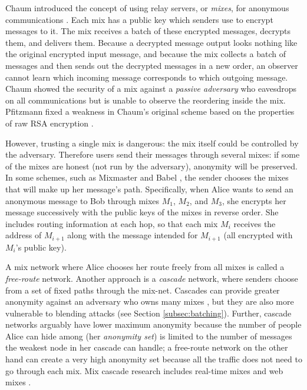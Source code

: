 \documentclass[11pt]{IEEEtran}
\begin{document}
Chaum introduced the concept of using relay servers, or \emph{mixes},
for anonymous communications \cite{chaum-mix}. Each mix has a public key
which senders use to encrypt messages to it. The mix receives a batch
of these encrypted messages, decrypts them, and delivers them. Because
a decrypted message output looks nothing like the original encrypted
input message,
and because the mix collects a batch of messages and then sends out the
decrypted messages in a new order, an observer cannot learn which incoming
message corresponds to which outgoing message. Chaum showed the
security of a mix against a \emph{passive adversary} who eavesdrops on
all communications but is unable to observe the reordering inside the mix.
Pfitzmann fixed a weakness in Chaum's original scheme based on the
properties of raw RSA encryption \cite{pfitzmann90how}.

However, trusting a single mix is dangerous: the mix itself could be
controlled by the adversary. Therefore users send their messages through
several mixes: if some of the mixes are honest (not run by the adversary),
anonymity will be preserved. In some schemes, such as Mixmaster
\cite{mixmaster-spec} and Babel \cite{babel}, the sender chooses the
mixes that will make up her message's path. Specifically, when Alice
wants to send an anonymous message to Bob through mixes $M_1$, $M_2$,
and $M_3$, she encrypts her message successively with the public keys of
the mixes in reverse order. She includes routing information at each hop,
so that each mix $M_i$ receives the address of $M_{i+1}$ along with the
message intended for $M_{i+1}$ (all encrypted with $M_i$'s public key).

A mix network where Alice chooses her route freely from all mixes is
called a \emph{free-route} network. Another approach is a \emph{cascade}
network, where senders choose from a set of fixed paths through the
mix-net. Cascades can provide greater anonymity against an adversary
who owns many mixes \cite{disad-free-routes}, but they are also more
vulnerable to blending attacks \cite{batching-taxonomy} (see Section
\ref{subsec:batching}). Further, cascade networks arguably have lower
maximum anonymity because the number of people Alice can hide among (her
\emph{anonymity set}) is limited to the number of messages the weakest
node in her cascade can handle; a free-route network on the other hand
can create a very high anonymity set because all the traffic does not
need to go through each mix. Mix cascade research includes real-time
mixes \cite{realtime-mix} and web mixes \cite{web-mix}.
\end{document}
